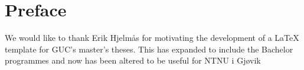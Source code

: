 \chapter*{Preface} %
\label{chap:preface}

We would like to thank Erik Hjelm\aa{}s for motivating the development of a \LaTeX{} template
 for GUC's master's theses.  This has expanded to include the Bachelor programmes and now has been altered to be useful for NTNU i Gj\o{}vik
 
 